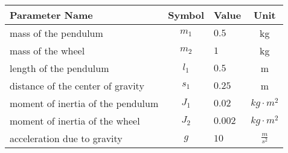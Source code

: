 \begin{tabular}{lclc}
\hline
 Parameter Name                    &  Symbol  & Value   &      Unit       \\
\hline
 mass of the pendulum              & $m_{1}$  & $0.5$   &       kg        \\
 mass of the wheel                 & $m_{2}$  & $1$     &       kg        \\
 length of the pendulum            & $l_{1}$  & $0.5$   &        m        \\
 distance of the center of gravity & $s_{1}$  & $0.25$  &        m        \\
 moment of inertia of the pendulum & $J_{1}$  & $0.02$  & $kg \cdot m^2$  \\
 moment of inertia of the wheel    & $J_{2}$  & $0.002$ & $kg \cdot m^2$  \\
 acceleration due to gravity       &   $g$    & $10$    & $\frac{m}{s^2}$ \\
\hline
\end{tabular}